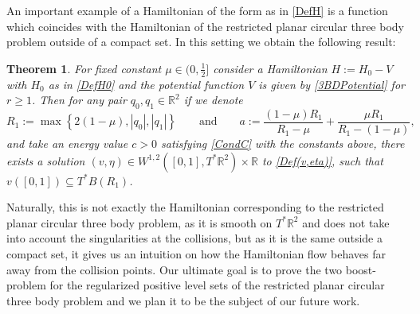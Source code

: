 \documentclass[a4paper]{amsart}
\newtheorem{thm}{Theorem}[section]
\numberwithin{equation}{section}
\newcommand{\R}{\mathbb{R}}
\begin{document}

An important example of a Hamiltonian of the form as in \eqref{DefH} is a function which coincides with the Hamiltonian of the restricted planar circular three body problem outside of a compact set. In this setting we obtain the following result:
\begin{thm}\label{thm:Chords3BD}
For fixed constant $\mu \in (0, \frac{1}{2}]$ consider a Hamiltonian $H:= H_0-V$ with $H_0$ as in \eqref{DefH0} and the potential function $V$ is given by \eqref{3BDPotential} for $r\geq 1$. Then for any pair $q_0,q_1\in \R^2$ if we denote 
\begin{equation}\label{Cond3BD}
 R_1:=\max\left\lbrace 2(1-\mu), |q_0|, |q_1|\right\rbrace \qquad \textrm{and} \qquad a:= \frac{(1-\mu)R_1}{R_1-\mu}+\frac{\mu R_1}{R_1- (1-\mu)},
\end{equation}
and take an energy value $c>0$ satisfying \eqref{CondC} with the constants above,
there exists a solution $(v,\eta)\in W^{1,2}([0,1], T^*\R^2)\times\R$ to \eqref{Def(v,eta)}, such that $v([0,1])\subseteq T^*B(R_1)$.
\end{thm}
Naturally, this is not exactly the Hamiltonian corresponding to the restricted planar circular three body problem, as it is smooth on $T^*\R^2$ and does not take into account the singularities at the collisions, but as it is the same outside a compact set, it gives us an intuition on how the Hamiltonian flow behaves far away from the collision points. Our ultimate goal is to prove the two boost-problem for the regularized positive level sets of the restricted planar circular three body problem and we plan it to be the subject of our future work.
\end{document}

